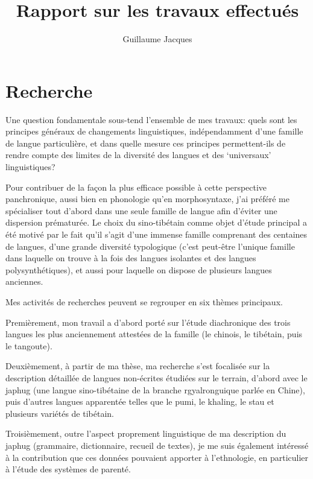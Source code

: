 \documentclass[oldfontcommands,oneside,a4paper,11pt]{article}
\begin{document}
\title{Rapport sur les travaux effectués}
\author{Guillaume Jacques}
\maketitle

\sloppy

\tableofcontents

\section{Recherche}
Une question fondamentale sous-tend l'ensemble de mes travaux: quels sont les principes généraux de changements linguistiques, indépendamment d'une famille de langue particulière, et dans quelle mesure  ces principes permettent-ils de rendre compte des limites de la diversité des langues et des `universaux' linguistiques?

Pour contribuer de la façon la plus efficace possible à cette perspective panchronique,  aussi bien en phonologie qu'en morphosyntaxe, j'ai préféré me spécialiser tout d'abord dans une seule famille de langue afin d'éviter une dispersion prématurée. Le choix du sino-tibétain comme objet d'étude principal a été motivé par le fait qu'il s'agit d'une immense famille comprenant des centaines de langues, d'une grande diversité typologique (c'est peut-être l'unique famille dans laquelle on trouve à la fois des langues isolantes et des langues polysynthétiques), et aussi pour laquelle on dispose de plusieurs langues anciennes.

Mes activités de recherches peuvent se regrouper en six thèmes principaux.

Premièrement, mon travail a d'abord porté sur l'étude diachronique des trois langues les plus anciennement attestées de la famille (le chinois, le tibétain, puis le tangoute). 

Deuxièmement, à partir de ma thèse, ma recherche s'est focalisée sur la description détaillée de langues non-écrites étudiées sur le terrain, d'abord avec le japhug (une langue sino-tibétaine de la branche rgyalronguique parlée en Chine), puis d'autres langues apparentée telles que le pumi, le khaling, le stau et plusieurs variétés de tibétain. 

Troisièmement, outre l'aspect proprement linguistique de ma description du japhug (grammaire, dictionnaire, recueil de textes), je me suis également intéressé à la contribution que ces données pouvaient apporter à l'ethnologie, en particulier à  l'étude des systèmes de parenté.
\end{document}
